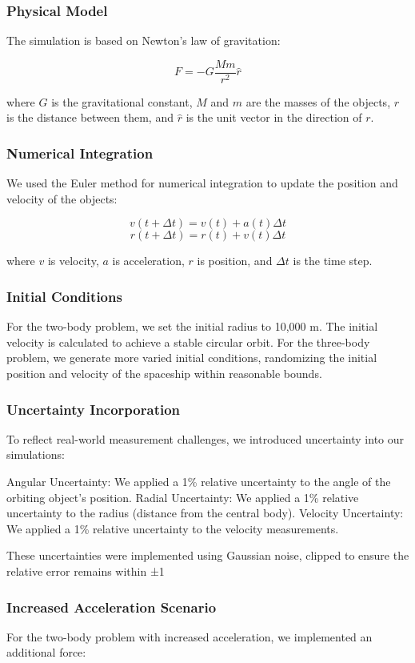 \documentclass[12pt,a4paper]{article}
\begin{document}
\subsubsection{Physical Model}
The simulation is based on Newton's law of gravitation:

\[F = -G \frac{M m}{r^2} \hat{r}\]

where $G$ is the gravitational constant, $M$ and $m$ are the masses of the objects, $r$ is the distance between them, and $\hat{r}$ is the unit vector in the direction of $r$.

\subsubsection{Numerical Integration}
We used the Euler method for numerical integration to update the position and velocity of the objects:

\[v(t + \Delta t) = v(t) + a(t)\Delta t\]
\[r(t + \Delta t) = r(t) + v(t)\Delta t\]

where $v$ is velocity, $a$ is acceleration, $r$ is position, and $\Delta t$ is the time step.
\subsubsection{Initial Conditions}
For the two-body problem, we set the initial radius to 10,000 m. The initial velocity is calculated to achieve a stable circular orbit. For the three-body problem, we generate more varied initial conditions, randomizing the initial position and velocity of the spaceship within reasonable bounds.

\subsubsection{Uncertainty Incorporation}
To reflect real-world measurement challenges, we introduced uncertainty into our simulations:

Angular Uncertainty: We applied a 1\% relative uncertainty to the angle of the orbiting object's position.
Radial Uncertainty: We applied a 1\% relative uncertainty to the radius (distance from the central body).
Velocity Uncertainty: We applied a 1\% relative uncertainty to the velocity measurements.

These uncertainties were implemented using Gaussian noise, clipped to ensure the relative error remains within ±1%
\subsubsection{Increased Acceleration Scenario}
For the two-body problem with increased acceleration, we implemented an additional force:
\end{document}
